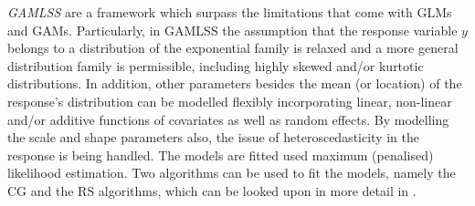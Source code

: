 
\textit{\ac{GAMLSS}} \citep{rigby2001gamlss, rigby2005generalized} are a framework which surpass the limitations that come with \acp{GLM} and \acp{GAM}. Particularly, in \ac{GAMLSS} the assumption that the response variable $y$ belongs to a distribution of the exponential family is relaxed and a more general distribution family is permissible, including highly skewed and/or kurtotic distributions. In addition, other parameters besides the mean (or location) of the response's distribution can be modelled flexibly incorporating linear, non-linear and/or additive functions of covariates as well as random effects. By modelling the scale and shape parameters also, the issue of heteroscedasticity in the response is being handled. The models are fitted used maximum (penalised) likelihood estimation. Two algorithms can be used to fit the models, namely the CG and the RS algorithms, which can be looked upon in more detail in \cite{rigby2005generalized}.
\\

